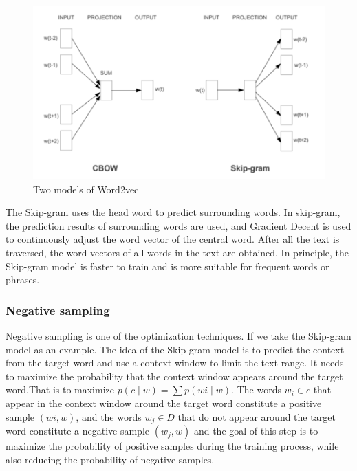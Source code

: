 \begin{figure}[ht]

\centering
\includegraphics[width=12cm,height=7cm\textwidth]{images/image_largevis_word2vec.PNG}
\caption{Two models of Word2vec}
\label{fig:label}
\end{figure}



\noindent The Skip-gram uses the head word to predict surrounding words. In skip-gram, the prediction results of surrounding words are used, and Gradient Decent is used to continuously adjust the word vector of the central word. After all the text is traversed, the word vectors of all words in the text are obtained. In principle, the Skip-gram model is faster to train and is more suitable for frequent words or phrases.\\


\subsubsection{Negative sampling}

\noindent Negative sampling is one of the optimization techniques. If we take the Skip-gram model as an example. The idea of the Skip-gram model is to predict the context from the target word and use a context window to limit the text range. It needs to maximize the probability that the context window appears around the target word.That is to maximize $p(c∣w)=∑p(wi∣w)$. The words $w_i ∈ c$ that appear in the context window around the target word constitute a positive sample $(wi, w)$, and the words $w_j ∈ D$ that do not appear around the target word constitute a negative sample $(w_j, w)$ and the goal of this step is to maximize the probability of positive samples during the training process, while also reducing the probability of negative samples.\\

